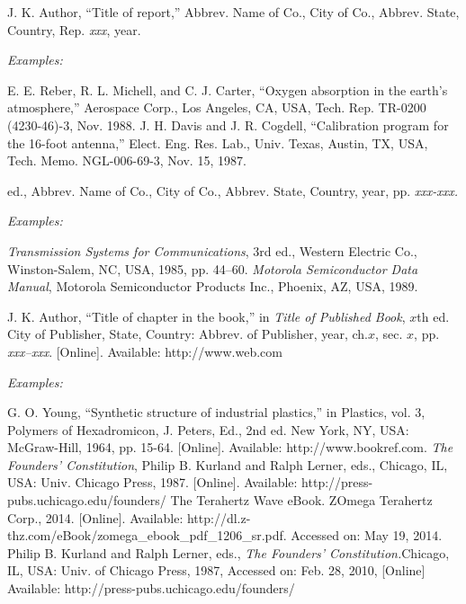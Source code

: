 \documentclass[journal,twoside,web]{ieeecolor}
\begin{document}

\noindent J. K. Author, ``Title of report,'' Abbrev. Name of Co., City of Co., Abbrev.
State, Country, Rep. {\it xxx}, year.

{\it Examples:}
\begin{thebibliography}{00}
 E. E. Reber, R. L. Michell, and C. J. Carter, ``Oxygen absorption in the earth's atmosphere,'' Aerospace Corp., Los Angeles, CA, USA, Tech. Rep. TR-0200 (4230-46)-3, Nov. 1988.
 J. H. Davis and J. R. Cogdell, ``Calibration program for the 16-foot antenna,'' Elect. Eng. Res. Lab., Univ. Texas, Austin, TX, USA, Tech. Memo. NGL-006-69-3, Nov. 15, 1987.
\end{thebibliography}


 ed., Abbrev. Name of Co., City of Co., Abbrev. State, Country, year, pp.
{\it xxx-xxx.}

{\it Examples:}{\vadjust{\vspace*{-2.5em}}}

\begin{thebibliography}{00}
 {\it Transmission Systems for Communications}, 3rd ed., Western Electric Co., Winston-Salem, NC, USA, 1985, pp. 44--60.
 {\it Motorola Semiconductor Data Manual}, Motorola Semiconductor Products Inc., Phoenix, AZ, USA, 1989.
\end{thebibliography}


\noindent J. K. Author, ``Title of chapter in the book,'' in {\it Title of Published Book}, $x$th ed. City of
Publisher, State, Country: Abbrev. of Publisher, year, ch.$x$, sec. $x$, pp.
{\it xxx--xxx}. [Online]. Available:  {http://www.web.com}




{\it Examples:}{\vadjust{\vspace*{-2.5em}}}

\begin{thebibliography}{00}
 G. O. Young, ``Synthetic structure of industrial plastics,'' in Plastics, vol. 3, Polymers of Hexadromicon, J. Peters, Ed., 2nd ed. New York, NY, USA: McGraw-Hill, 1964, pp. 15-64. [Online]. Available:  {http://www.bookref.com}.
 {\it The Founders' Constitution}, Philip B. Kurland and Ralph Lerner, eds., Chicago, IL, USA: Univ. Chicago Press, 1987. [Online]. Available:  {http://press-pubs.uchicago.edu/founders/}
 The Terahertz Wave eBook. ZOmega Terahertz Corp., 2014. [Online]. Available:  {http://dl.z-thz.com/eBook/zomega\_ebook\_pdf\_1206\_sr.pdf}. Accessed on: May 19, 2014.
 Philip B. Kurland and Ralph Lerner, eds., {\it The Founders' Constitution.}Chicago, IL, USA: Univ. of Chicago Press, 1987, Accessed on: Feb. 28, 2010, [Online] Available:  {http://press-pubs.uchicago.edu/founders/}
\end{thebibliography}
\end{document}
